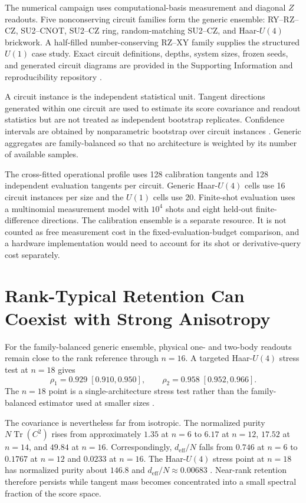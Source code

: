 \documentclass[ASNA,twocolumn]{USG}
\begin{document}
The numerical campaign uses computational-basis measurement and diagonal $Z$ readouts. Five nonconserving circuit families form the generic ensemble: RY--RZ--CZ, SU2--CNOT, SU2--CZ ring, random-matching SU2--CZ, and Haar-$U(4)$ brickwork. A half-filled number-conserving RZ--XY family supplies the structured $U(1)$ case study. Exact circuit definitions, depths, system sizes, frozen seeds, and generated circuit diagrams are provided in the Supporting Information and reproducibility repository \cite{Bergholm2018,AitHaddou2026MeasurementAccessible}.

A circuit instance is the independent statistical unit. Tangent directions generated within one circuit are used to estimate its score covariance and readout statistics but are not treated as independent bootstrap replicates. Confidence intervals are obtained by nonparametric bootstrap over circuit instances \cite{Efron1979}. Generic aggregates are family-balanced so that no architecture is weighted by its number of available samples.

The cross-fitted operational profile uses 128 calibration tangents and 128 independent evaluation tangents per circuit. Generic Haar-$U(4)$ cells use 16 circuit instances per size and the $U(1)$ cells use 20. Finite-shot evaluation uses a multinomial measurement model with $10^4$ shots and eight held-out finite-difference directions. The calibration ensemble is a separate resource. It is not counted as free measurement cost in the fixed-evaluation-budget comparison, and a hardware implementation would need to account for its shot or derivative-query cost separately.

\section{Rank-Typical Retention Can Coexist with Strong Anisotropy}

For the family-balanced generic ensemble, physical one- and two-body readouts remain close to the rank reference through $n=16$. A targeted Haar-$U(4)$ stress test at $n=18$ gives
\begin{equation}
 \rho_1=0.929\;[0.910,0.950],
 \qquad
 \rho_2=0.958\;[0.952,0.966].
\label{eq:aqt-n18-rho}
\end{equation}
The $n=18$ point is a single-architecture stress test rather than the family-balanced estimator used at smaller sizes \cite{AitHaddou2026MeasurementAccessible}.

The covariance is nevertheless far from isotropic. The normalized purity $N\operatorname{Tr}(C^2)$ rises from approximately $1.35$ at $n=6$ to $6.17$ at $n=12$, $17.52$ at $n=14$, and $49.84$ at $n=16$. Correspondingly, $d_{\mathrm{eff}}/N$ falls from $0.746$ at $n=6$ to $0.1767$ at $n=12$ and $0.0233$ at $n=16$. The Haar-$U(4)$ stress point at $n=18$ has normalized purity about $146.8$ and $d_{\mathrm{eff}}/N\approx0.00683$ \cite{AitHaddou2026MeasurementAccessible}. Near-rank retention therefore persists while tangent mass becomes concentrated into a small spectral fraction of the score space.
\end{document}
